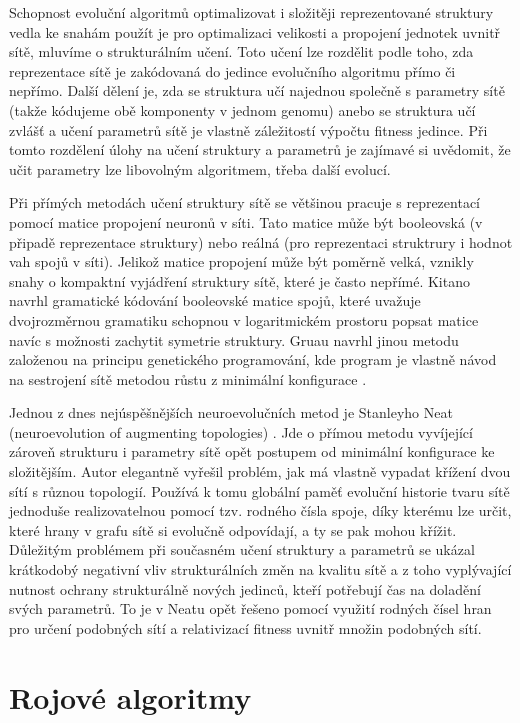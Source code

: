 \documentclass[12pt,fleqn,a4paper,proc]{article}
\begin{document}
Schopnost evoluční algoritmů optimalizovat i složitěji reprezentované struktury vedla ke snahám použít je pro optimalizaci velikosti a propojení jednotek uvnitř sítě, mluvíme o strukturálním učení. Toto učení lze rozdělit podle toho, zda reprezentace sítě je zakódovaná do jedince evolučního algoritmu přímo či nepřímo. Další dělení je, zda se struktura učí najednou společně s parametry sítě (takže kódujeme obě komponenty v jednom genomu) anebo se struktura učí zvlášť a učení parametrů sítě je vlastně záležitostí výpočtu fitness jedince. Při tomto rozdělení úlohy na učení struktury a parametrů je zajímavé si uvědomit, že učit parametry lze libovolným algoritmem, třeba další evolucí.

Při přímých metodách učení struktury sítě se většinou pracuje s reprezentací pomocí matice propojení neuronů v síti. Tato matice může být booleovská (v připadě reprezentace struktury) nebo reálná (pro reprezentaci struktrury i hodnot vah spojů v síti). Jelikož matice propojení může být poměrně velká, vznikly snahy o kompaktní vyjádření struktury sítě, které je často nepřímé. Kitano navrhl gramatické kódování booleovské matice spojů, které uvažuje dvojrozměrnou gramatiku schopnou v logaritmickém prostoru popsat matice navíc s možnosti zachytit symetrie struktury. Gruau navrhl jinou metodu založenou na principu genetického programování, kde program je vlastně návod na sestrojení sítě metodou růstu z minimální konfigurace \cite{gruau}. 

Jednou z dnes nejúspěšnějších neuroevolučních metod je Stanleyho Neat (neuroevolution of augmenting topologies) \cite{stanley}. Jde o přímou metodu vyvíjející zároveň strukturu i parametry sítě opět postupem od minimální konfigurace ke složitějším. Autor elegantně vyřešil problém, jak má vlastně vypadat křížení dvou sítí s různou topologií. Používá k tomu globální paměť evoluční historie tvaru sítě jednoduše realizovatelnou pomocí tzv. rodného čísla spoje, díky kterému lze určit, které hrany v grafu sítě si evolučně odpovídají, a ty se pak mohou křížit. Důležitým problémem při současném učení struktury a parametrů se ukázal krátkodobý negativní vliv strukturálních změn na kvalitu sítě a z toho vyplývající nutnost ochrany strukturálně nových jedinců, kteří potřebují čas na doladění svých parametrů. To je v Neatu opět řešeno pomocí využití rodných čísel hran pro určení podobných sítí a relativizací fitness uvnitř množin podobných sítí. 


\section{Rojové algoritmy}
\end{document}
